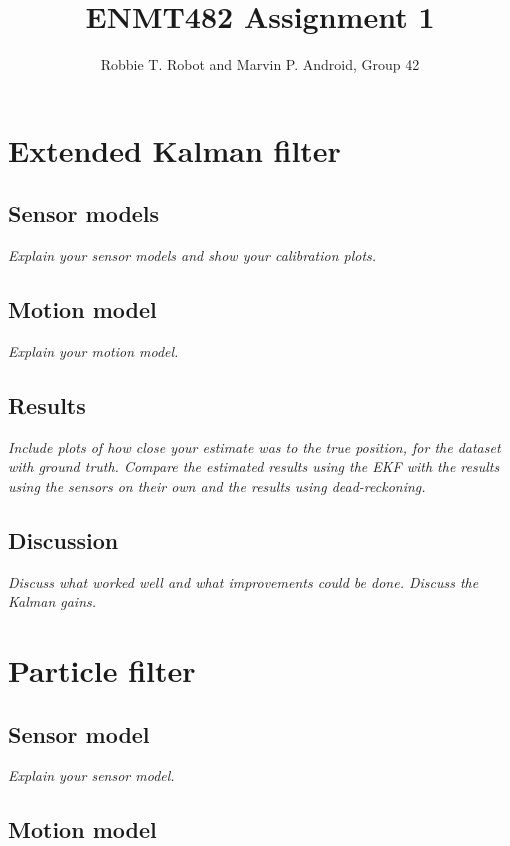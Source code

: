 \documentclass[a4paper,12pt]{article}
\title{ENMT482 Assignment 1}
\author{Robbie T. Robot and Marvin P. Android, Group 42}
\date{}
\newcommand{\comment}[1]{\emph{\color{blue}#1}}
\begin{document}
\maketitle

\section{Extended Kalman filter}


\subsection{Sensor models}

\comment{Explain your sensor models and show your calibration plots.}


\subsection{Motion model}

\comment{Explain your motion model.}


\subsection{Results}

\comment{Include plots of how close your estimate was to the true
  position, for the dataset with ground truth.  Compare the estimated
  results using the EKF with the results using the sensors on their
  own and the results using dead-reckoning.}


\subsection{Discussion}

\comment{Discuss what worked well and what improvements could be done.
  Discuss the Kalman gains.}


\section{Particle filter}

\subsection{Sensor model}

\comment{Explain your sensor model.}


\subsection{Motion model}
\end{document}

